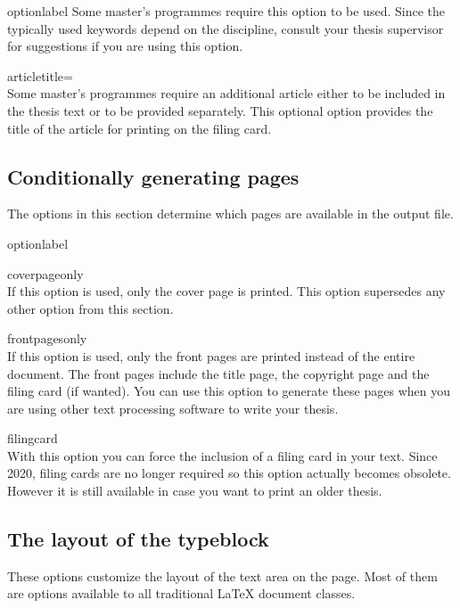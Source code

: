 \begin{labelled}{optionlabel}
  Some master's programmes require this option to be used. Since the typically
  used keywords depend on the discipline, consult your thesis supervisor for
  suggestions if you are using this option.

\item[articletitle=\meta{arttitle}]\\
  Some master's programmes require an additional article either to be included
  in the thesis text or to be provided separately. This optional option
  provides the title  of the article for printing on the filing
  card.
\end{labelled}

\subsection{Conditionally generating pages}
The options in this section determine which pages are available in the
output file.

\begin{labelled}{optionlabel}
\item[coverpageonly]\\
  If this option is used, only the cover page is printed. This option
  supersedes any other option from this section.

\item[frontpagesonly]\\
  If this option is used, only the front pages are printed instead of the
  entire document. The front pages include the title page, the copyright
  page and the filing card (if wanted). You can use this option to generate
  these pages when you are using other text processing software to write
  your thesis.

\item[filingcard]\\
  With this option you can force the inclusion of a filing card in your text.
  Since 2020, filing cards are no longer required so this option actually
  becomes obsolete. However it is still available in case you want to print an
  older thesis.
\end{labelled}

\subsection{The layout of the typeblock}
These options customize the layout of the text area on the page. Most of
them are options available to all traditional LaTeX document classes.

